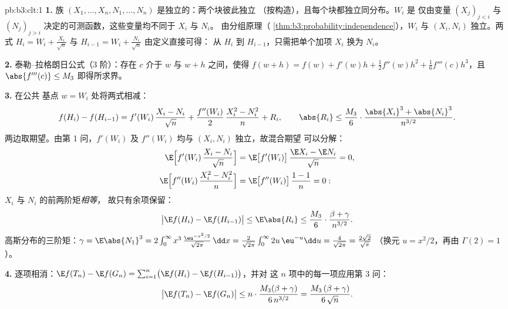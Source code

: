\begin{solution}{pb:b3:clt:1}
\textbf{1.} 族 $(X_1, \dots, X_n, N_1, \dots, N_n)$
是独立的：两个块彼此独立
（按构造），且每个块都独立同分布。$W_i$ 是
仅由变量 $(X_j)_{j<i}$ 与
$(N_j)_{j>i}$ 决定的可测函数，这些变量均不同于 $X_i$ 与 $N_i$。
由分组原理（
\cref{thm:b3:probability:independence}），$W_i$
与 $(X_i, N_i)$ 独立。两式
$H_i = W_i + \frac{X_i}{\sqrt n}$ 与 $H_{i-1} = W_i +
\frac{N_i}{\sqrt n}$ 由定义直接可得：
从 $H_i$ 到 $H_{i-1}$，只需把单个加项
$X_i$ 换为 $N_i$。

\textbf{2.} 泰勒–拉格朗日公式（$3$ 阶）：存在 $c$
介于 $w$ 与 $w + h$ 之间，使得 $f(w + h) = f(w) + f'(w)h +
\frac12f''(w)h^2 + \frac16f'''(c)h^3$，且 $\abs{f'''(c)}
\leq M_3$ 即得所求界。

\textbf{3.} 在公共
基点 $w = W_i$ 处将两式相减：
\[
f(H_i) - f(H_{i-1}) = f'(W_i)\,\frac{X_i - N_i}{\sqrt n} +
\frac{f''(W_i)}{2}\,\frac{X_i^2 - N_i^2}{n} + R_i,
\qquad
\abs{R_i} \leq \frac{M_3}{6}\cdot
\frac{\abs{X_i}^3 + \abs{N_i}^3}{n^{3/2}} .
\]
两边取期望。由第 1 问，$f'(W_i)$ 及 $f''(W_i)$
均与 $(X_i, N_i)$ 独立，故混合期望
可以分解：
\begin{align*}
\E\Bigl[f'(W_i)\,\frac{X_i - N_i}{\sqrt n}\Bigr] &=
\E\bigl[f'(W_i)\bigr]\,\frac{\E X_i - \E N_i}{\sqrt n} = 0,
\\
\E\Bigl[f''(W_i)\,\frac{X_i^2 - N_i^2}{n}\Bigr] &=
\E\bigl[f''(W_i)\bigr]\,\frac{1 - 1}{n} = 0 :
\end{align*}
$X_i$ 与 $N_i$ 的前两阶矩\emph{相等}，
故只有余项保留：
\[
\bigl|\E f(H_i) - \E f(H_{i-1})\bigr| \leq \E\abs{R_i} \leq
\frac{M_3}{6}\cdot\frac{\beta + \gamma}{n^{3/2}} .
\]
高斯分布的三阶矩：$\gamma = \E\abs{N_1}^3 =
2\int_0^\infty x^3\,\frac{\eu^{-x^2/2}}{\sqrt{2\pi}}\,\dd x
= \frac{2}{\sqrt{2\pi}}\int_0^\infty 2u\,\eu^{-u}\dd u =
\frac{4}{\sqrt{2\pi}} = \frac{2\sqrt2}{\sqrt\pi}$
（换元 $u = x^2/2$，再由 $\Gamma(2) = 1$）。

\textbf{4.} 逐项相消：$\E f(T_n) - \E f(G_n) =
\sum_{i=1}^n\bigl(\E f(H_i) - \E f(H_{i-1})\bigr)$，并对
这 $n$ 项中的每一项应用第 3 问：
\[
\bigl|\E f(T_n) - \E f(G_n)\bigr| \leq
n \cdot \frac{M_3(\beta + \gamma)}{6\,n^{3/2}} =
\frac{M_3\,(\beta + \gamma)}{6\,\sqrt n} .
\]


\end{solution}

